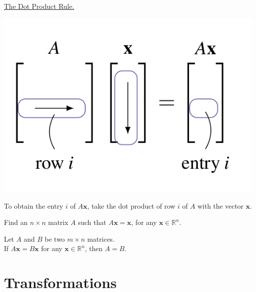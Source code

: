 \documentclass[20pt,a4paper]{extarticle}
\newcounter{example}[section]
\newcounter{theorem}
\begin{document}
\phantom{2} 

\vfill 

\underline{The Dot Product Rule.}

\begin{minipage}{0.45\textwidth}
\includegraphics[scale=0.4]{DotProductRule.png}
\end{minipage}
\hspace*{1cm}
\begin{minipage}{0.45\textwidth}
To obtain the entry $i$ of $A \mathbf{x}$, take the dot product of row $i$ of $A$ with the vector $\mathbf{x}$.
\end{minipage}

\newpage 

\begin{example}
Find an $n \times n$ matrix $A$ such that $A \mathbf{x} = \mathbf{x}$, for any $\mathbf{x} \in \mathbb{R}^n$.
\end{example}

\begin{solution}

\end{solution}

\vfill 

\begin{theorem}
Let $A$ and $B$ be two $m \times n$ matrices. \\ 
If $A \mathbf{x} = B \mathbf{x}$ for any $\mathbf{x} \in \mathbb{R}^n$, then $A = B$. 
\end{theorem}

\newpage 

\section{Transformations}
\end{document}
